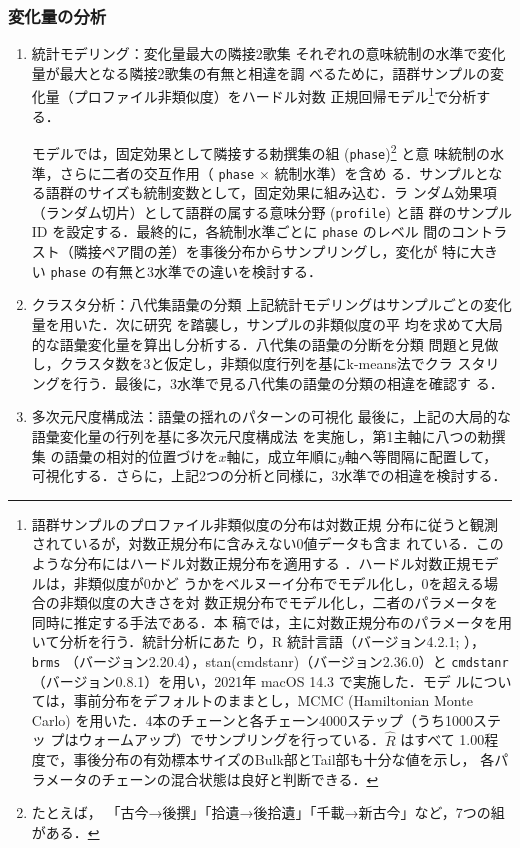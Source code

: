 \documentclass[submit]{ipsj}
\begin{document}
\subsubsection{変化量の分析\label{org52de0bc}}
\label{sec:org44dda56}
\begin{enumerate}
\item 統計モデリング：変化量最大の隣接2歌集\label{orgb479134}
\label{sec:orgbfabc6c}
それぞれの意味統制の水準で変化量が最大となる隣接2歌集の有無と相違を調
べるために，語群サンプルの変化量（プロファイル非類似度）をハードル対数
正規回帰モデル\footnote{語群サンプルのプロファイル非類似度の分布は対数正規
分布に従うと観測されているが，対数正規分布に含みえない0値データも含ま
れている．このような分布にはハードル対数正規分布を適用する
\cite{Chaudhry2018NGO}．ハードル対数正規モデルは，非類似度が0かど
うかをベルヌーイ分布でモデル化し，0を超える場合の非類似度の大きさを対
数正規分布でモデル化し，二者のパラメータを同時に推定する手法である．本
稿では，主に対数正規分布のパラメータを用いて分析を行う．統計分析にあた
り，R 統計言語（バージョン4.2.1; \cite{RCoreTeam2022Language}），
\texttt{brms} （バージョン2.20.4），stan(cmdstanr)（バージョン2.36.0）と
\texttt{cmdstanr} （バージョン0.8.1）を用い，2021年 macOS 14.3 で実施した．モデ
ルについては，事前分布をデフォルトのままとし，MCMC (Hamiltonian Monte
Carlo) を用いた．4本のチェーンと各チェーン4000ステップ（うち1000ステッ
プはウォームアップ）でサンプリングを行っている．\(\hat{R}\) はすべて
1.00程度で，事後分布の有効標本サイズのBulk部とTail部も十分な値を示し，
各パラメータのチェーンの混合状態は良好と判断できる．}で分析する．

モデルでは，固定効果として隣接する勅撰集の組 (\texttt{phase})\footnote{たとえば，
「古今→後撰」「拾遺→後拾遺」「千載→新古今」など，7つの組がある．} と意
味統制の水準，さらに二者の交互作用（ \texttt{phase} \(\times\) 統制水準）を含め
る．サンプルとなる語群のサイズも統制変数として，固定効果に組み込む．ラ
ンダム効果項（ランダム切片）として語群の属する意味分野 (\texttt{profile}) と語
群のサンプル ID を設定する．最終的に，各統制水準ごとに \texttt{phase} のレベル
間のコントラスト（隣接ペア間の差）を事後分布からサンプリングし，変化が
特に大きい \texttt{phase} の有無と3水準での違いを検討する．
\item クラスタ分析：八代集語彙の分類\label{orgef6c484}
\label{sec:orgc9e89cf}
上記統計モデリングはサンプルごとの変化量を用いた．次に研究
\cite{Speelman2003Profilebased} を踏襲し，サンプルの非類似度の平
均を求めて大局的な語彙変化量を算出し分析する．八代集の語彙の分断を分類
問題と見做し，クラスタ数を3と仮定し，非類似度行列を基にk-means法でクラ
スタリングを行う．最後に，3水準で見る八代集の語彙の分類の相違を確認す
る．
\item 多次元尺度構成法：語彙の揺れのパターンの可視化\label{orgfbd2af5}
\label{sec:org4647ae3}
最後に，上記の大局的な語彙変化量の行列を基に多次元尺度構成法
\cite{Kruskal1964Multidimensional} を実施し，第1主軸に八つの勅撰集
の語彙の相対的位置づけを\(x\)軸に，成立年順に\(y\)軸へ等間隔に配置して，
可視化する．さらに，上記2つの分析と同様に，3水準での相違を検討する．
\end{enumerate}
\end{document}
